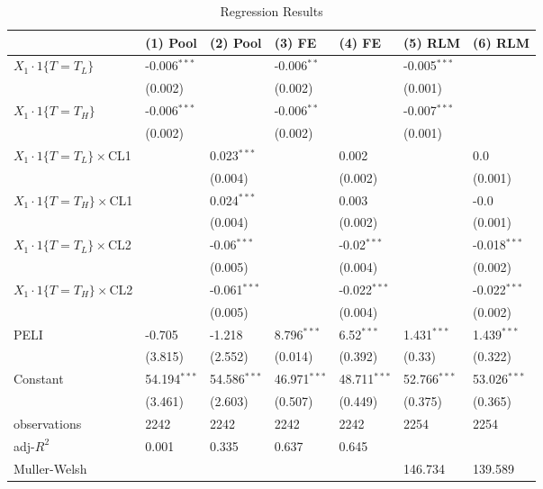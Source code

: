\documentclass[12pt]{article}
\begin{document}
\begin{table}
    \caption{Regression Results}
    \vspace*{12pt}
    \centering

      \begin{tabular}{lllllll}
\hline
 & (1) Pool & (2) Pool & (3) FE & (4) FE & (5) RLM & (6) RLM \\
\hline
$X_1\cdot1\{T=T_L\}$ & -0.006$^{***}$ &  & -0.006$^{**}$ &  & -0.005$^{***}$ &  \\
 & (0.002) &  & (0.002) &  & (0.001) &  \\
$X_1\cdot1\{T=T_H\}$ & -0.006$^{***}$ &  & -0.006$^{**}$ &  & -0.007$^{***}$ &  \\
 & (0.002) &  & (0.002) &  & (0.001) &  \\
$X_1\cdot1\{T=T_L\}\times$CL1 &  & 0.023$^{***}$ &  & 0.002 &  & 0.0 \\
 &  & (0.004) &  & (0.002) &  & (0.001) \\
$X_1\cdot1\{T=T_H\}\times$CL1 &  & 0.024$^{***}$ &  & 0.003 &  & -0.0 \\
 &  & (0.004) &  & (0.002) &  & (0.001) \\
$X_1\cdot1\{T=T_L\}\times$CL2 &  & -0.06$^{***}$ &  & -0.02$^{***}$ &  & -0.018$^{***}$ \\
 &  & (0.005) &  & (0.004) &  & (0.002) \\
$X_1\cdot1\{T=T_H\}\times$CL2 &  & -0.061$^{***}$ &  & -0.022$^{***}$ &  & -0.022$^{***}$ \\
 &  & (0.005) &  & (0.004) &  & (0.002) \\
PELI & -0.705 & -1.218 & 8.796$^{***}$ & 6.52$^{***}$ & 1.431$^{***}$ & 1.439$^{***}$ \\
 & (3.815) & (2.552) & (0.014) & (0.392) & (0.33) & (0.322) \\
Constant & 54.194$^{***}$ & 54.586$^{***}$ & 46.971$^{***}$ & 48.711$^{***}$ & 52.766$^{***}$ & 53.026$^{***}$ \\
 & (3.461) & (2.603) & (0.507) & (0.449) & (0.375) & (0.365) \\\hline

observations & 2242 & 2242 & 2242 & 2242 & 2254 & 2254 \\
adj-$R^2$ & 0.001 & 0.335 & 0.637 & 0.645 &  &  \\
Muller-Welsh &  &  &  &  & 146.734 & 139.589 \\
\hline
\end{tabular}


\end{table}
\end{document}
